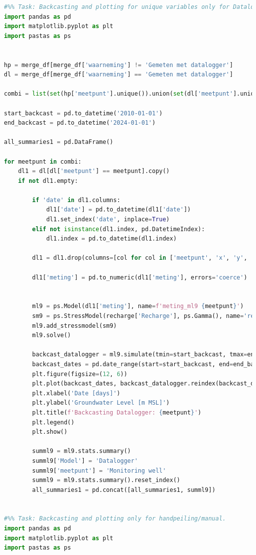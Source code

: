 \begin{lstlisting}[language=Python]
#%% Task: Backcasting and plotting for unique variables only for Datalogger. 
import pandas as pd
import matplotlib.pyplot as plt
import pastas as ps


hp = merge_df[merge_df['waarneming'] != 'Gemeten met datalogger']
dl = merge_df[merge_df['waarneming'] == 'Gemeten met datalogger']

combi = list(set(hp['meetpunt'].unique()).union(set(dl['meetpunt'].unique())))

start_backcast = pd.to_datetime('2010-01-01')
end_backcast = pd.to_datetime('2024-01-01')

all_summaries1 = pd.DataFrame()

for meetpunt in combi:
    dl1 = dl[dl['meetpunt'] == meetpunt].copy()
    if not dl1.empty:
        
        if 'date' in dl1.columns:
            dl1['date'] = pd.to_datetime(dl1['date'])
            dl1.set_index('date', inplace=True)
        elif not isinstance(dl1.index, pd.DatetimeIndex):  
            dl1.index = pd.to_datetime(dl1.index)
        
        dl1 = dl1.drop(columns=[col for col in ['meetpunt', 'x', 'y', 'ID', 'meethoogte'] if col in dl1.columns])
        
        dl1['meting'] = pd.to_numeric(dl1['meting'], errors='coerce')

        
        ml9 = ps.Model(dl1['meting'], name=f'meting_ml9 {meetpunt}')
        sm9 = ps.StressModel(recharge['Recharge'], ps.Gamma(), name='recharge', settings='evap')
        ml9.add_stressmodel(sm9)
        ml9.solve()
        
        backcast_datalogger = ml9.simulate(tmin=start_backcast, tmax=end_backcast)
        backcast_dates = pd.date_range(start=start_backcast, end=end_backcast, freq='D')
        plt.figure(figsize=(12, 6))
        plt.plot(backcast_dates, backcast_datalogger.reindex(backcast_dates), label='Datalogger', color='pink')
        plt.xlabel('Date [days]')
        plt.ylabel('Groundwater Level [m MSL]')
        plt.title(f'Backcasting Datalogger: {meetpunt}')
        plt.legend()
        plt.show()
        
        summl9 = ml9.stats.summary()
        summl9['Model'] = 'Datalogger'
        summl9['meetpunt'] = 'Monitoring well'
        summl9 = ml9.stats.summary().reset_index()
        all_summaries1 = pd.concat([all_summaries1, summl9])


#%% Task: Backcasting and plotting only for handpeiling/manual. 
import pandas as pd
import matplotlib.pyplot as plt
import pastas as ps



\end{lstlisting}
